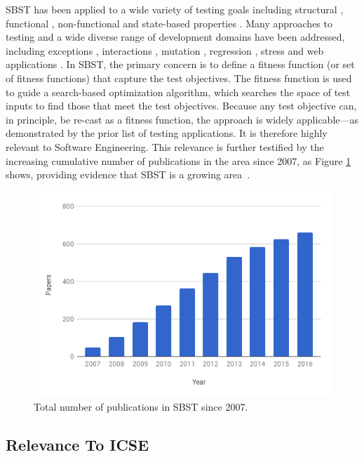 \documentclass[10pt,conference]{IEEEtran}
\begin{document}
SBST has been applied to a wide variety of testing goals including
structural \cite{tonella:classes}, functional \cite{wegener:parking},
non-functional \cite{wegener:verifying} and state-based properties
\cite{joshmh:gecco11}.  Many approaches to testing and a wide diverse
range of development domains have been addressed, including exceptions
\cite{tracey-00}, interactions \cite{cohen:constructing},
mutation \cite{zhan:search-based}, regression \cite{syetal:issta09},
stress \cite{briand-stress-small} and web applications
\cite{Thome14:sec}. In SBST, the primary concern is to define a
fitness function (or set of fitness functions) that capture the test
objectives.  The fitness function is used to guide a search-based
optimization algorithm, which searches the space of test inputs to
find those that meet the test objectives.  Because any test objective
can, in principle, be re-cast as a fitness function, the approach is
widely applicable---as demonstrated by the prior list of testing
applications.  It is therefore highly relevant to Software
Engineering.  This relevance is further testified by the increasing
cumulative number of publications in the area since 2007, as Figure
\ref{fig:pubs} shows, providing evidence that SBST is a growing
area~\cite{yzmham:sbse-repository}.

\begin{figure}
\centering
\includegraphics[width=\columnwidth]{chart.png}
\caption{\label{fig:pubs}Total number of publications in SBST since
  2007.}
\end{figure}


\subsection{Relevance To ICSE}
\label{sec:relevance-icse}
\end{document}
